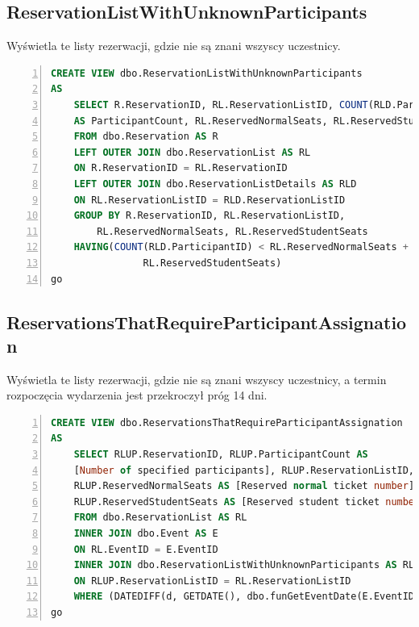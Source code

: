 \documentclass[]{article}
\begin{document}
	\subsection{ReservationListWithUnknownParticipants}
	Wyświetla te listy rezerwacji, gdzie nie są znani wszyscy uczestnicy.
	\begin{lstlisting}[language=SQL,
						showspaces=false,
						basicstyle=\ttfamily,
						numbers=left,
						numberstyle=\tiny,
						backgroundcolor=\color{lightg},
						keywordstyle=\color{lightblue},
						commentstyle=\color{gray}]
CREATE VIEW dbo.ReservationListWithUnknownParticipants
AS
	SELECT R.ReservationID, RL.ReservationListID, COUNT(RLD.ParticipantID)
	AS ParticipantCount, RL.ReservedNormalSeats, RL.ReservedStudentSeats
	FROM dbo.Reservation AS R
	LEFT OUTER JOIN dbo.ReservationList AS RL
	ON R.ReservationID = RL.ReservationID
	LEFT OUTER JOIN dbo.ReservationListDetails AS RLD
	ON RL.ReservationListID = RLD.ReservationListID
	GROUP BY R.ReservationID, RL.ReservationListID,
		RL.ReservedNormalSeats, RL.ReservedStudentSeats
	HAVING(COUNT(RLD.ParticipantID) < RL.ReservedNormalSeats +
				RL.ReservedStudentSeats)
go
	\end{lstlisting}

	\subsection{ReservationsThatRequireParticipantAssignation}
	Wyświetla te listy rezerwacji, gdzie nie są znani wszyscy uczestnicy, a termin rozpoczęcia wydarzenia jest przekroczył próg 14 dni.
	\begin{lstlisting}[language=SQL,
						showspaces=false,
						basicstyle=\ttfamily,
						numbers=left,
						numberstyle=\tiny,
						backgroundcolor=\color{lightg},
						keywordstyle=\color{lightblue},
						commentstyle=\color{gray}]
CREATE VIEW dbo.ReservationsThatRequireParticipantAssignation
AS
	SELECT RLUP.ReservationID, RLUP.ParticipantCount AS
	[Number of specified participants], RLUP.ReservationListID,
	RLUP.ReservedNormalSeats AS [Reserved normal ticket number], 
	RLUP.ReservedStudentSeats AS [Reserved student ticket number]
	FROM dbo.ReservationList AS RL
	INNER JOIN dbo.Event AS E
	ON RL.EventID = E.EventID
	INNER JOIN dbo.ReservationListWithUnknownParticipants AS RLUP
	ON RLUP.ReservationListID = RL.ReservationListID
	WHERE (DATEDIFF(d, GETDATE(), dbo.funGetEventDate(E.EventID)) <= 14)
go
	\end{lstlisting}
\end{document}
